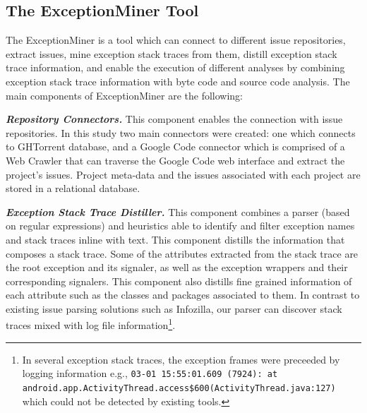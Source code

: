 \documentclass[conference]{IEEEtran}
\begin{document}
\subsection{The ExceptionMiner Tool}
\label{sec:exceptionminer}

The ExceptionMiner is a tool which can connect to different issue repositories, 
extract issues, mine exception stack traces from them, distill exception stack trace information,
and enable the execution of different analyses by combining exception stack 
trace information with byte code and source code analysis. The main components of ExceptionMiner are the following:

\emph{\textbf{Repository Connectors.}} This component enables the connection 
with issue repositories. In this study two main connectors were created: one which connects to 
GHTorrent database, and a Google Code connector which is comprised of a Web Crawler
 that can traverse the Google Code web interface and extract the project's issues. 
Project meta-data and the issues associated with each project are stored in a relational 
database.

\emph{\textbf{Exception Stack Trace Distiller.}}
This component combines a parser (based on regular expressions) 
and heuristics able to identify and filter exception names and stack traces inline with text. 
This component distills the information that composes a stack trace.
 Some of the attributes extracted from the stack trace are
 the root exception and its signaler, as well as the exception wrappers and their corresponding signalers. 
This component also distills fine grained information of each attribute such as the classes and packages associated to them.
In contrast to existing issue parsing solutions such as Infozilla, our parser
 can discover stack traces mixed with log file information\footnote{In several 
exception stack traces, the exception frames were preceeded by logging information e.g., 
\texttt{03-01 15:55:01.609 (7924): at android.app.ActivityThread.access\$600(ActivityThread\-.java:127)} which could not be detected by existing tools.}.
\end{document}
